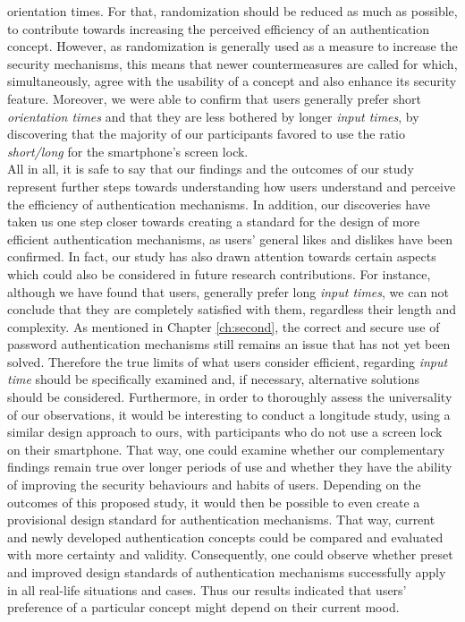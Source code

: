 orientation times. For that, randomization should be reduced as much as possible, to contribute towards increasing the perceived efficiency of an authentication concept. However, as randomization is generally used as a measure to increase the security mechanisms, this means that newer countermeasures are called for which, simultaneously, agree with the usability of a concept and also enhance its security feature. Moreover, we were able to confirm that users generally prefer short \textit{orientation times} and that they are less bothered by longer \textit{input times}, by discovering that the majority of our participants favored to use the ratio \textit{short/long} for the smartphone's screen lock. \\

All in all, it is safe to say that our findings and the outcomes of our study represent further steps towards understanding how users understand and perceive the efficiency of authentication mechanisms. In addition, our discoveries have taken us one step closer towards creating a standard for the design of more efficient authentication mechanisms, as users' general likes and dislikes have been confirmed. In fact, our study has also drawn attention towards certain aspects which could also be considered in future research contributions. For instance, although we have found that users, generally prefer long \textit{input times}, we can not conclude that they are completely satisfied with them, regardless their length and complexity. As mentioned in Chapter \ref{ch:second}, the correct and secure use of password authentication mechanisms still remains an issue that has not yet been solved. Therefore the true limits of what users consider efficient, regarding \textit{input time} should be specifically examined and, if necessary, alternative solutions should be considered. Furthermore, in order to thoroughly assess the universality of our observations, it would be interesting to conduct a longitude study, using a similar design approach to ours, with participants who do not use a screen lock on their smartphone. That way, one could examine whether our complementary findings remain true over longer periods of use and whether they have the ability of improving the security behaviours and habits of users. Depending on the outcomes of this proposed study, it would then be possible to even create a provisional design standard for authentication mechanisms. That way, current and newly developed authentication concepts could be compared and evaluated with more certainty and validity. Consequently, one could observe whether preset and improved design standards of authentication mechanisms successfully apply in all real-life situations and cases. Thus our results indicated that users' preference of a particular concept might depend on their current mood.  


